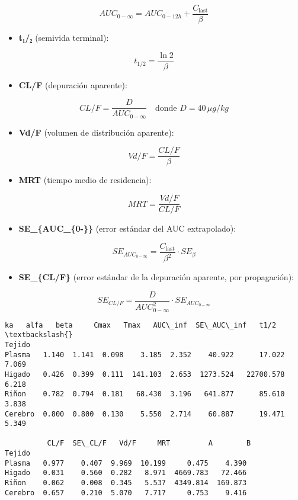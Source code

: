 \documentclass[11pt]{article}
\providecommand{\tightlist}{%
      \setlength{\itemsep}{0pt}\setlength{\parskip}{0pt}}
\begin{document}
\[
AUC_{0-\infty} = AUC_{0-12h} + \frac{C_{\text{last}}}{\beta}
\]

\begin{itemize}
\tightlist
\item
  \textbf{t₁/₂} (semivida terminal):
\end{itemize}

\[
t_{1/2} = \frac{\ln 2}{\beta}
\]

\begin{itemize}
\tightlist
\item
  \textbf{CL/F} (depuración aparente):
\end{itemize}

\[
CL/F = \frac{D}{AUC_{0-\infty}} \quad \text{donde } D = 40 \, \mu g/kg
\]

\begin{itemize}
\tightlist
\item
  \textbf{Vd/F} (volumen de distribución aparente):
\end{itemize}

\[
Vd/F = \frac{CL/F}{\beta}
\]

\begin{itemize}
\tightlist
\item
  \textbf{MRT} (tiempo medio de residencia):
\end{itemize}

\[
MRT = \frac{Vd/F}{CL/F}
\]

\begin{itemize}
\tightlist
\item
  \textbf{SE\_\{AUC\_\{0-\infty\}\}} (error estándar del AUC
  extrapolado):
\end{itemize}

\[
SE_{AUC_{0-\infty}} = \frac{C_{\text{last}}}{\beta^2} \cdot SE_{\beta}
\]

\begin{itemize}
\tightlist
\item
  \textbf{SE\_\{CL/F\}} (error estándar de la depuración aparente, por
  propagación):
\end{itemize}

\[
SE_{CL/F} = \frac{D}{AUC_{0-\infty}^2} \cdot SE_{AUC_{0-\infty}}
\]

    \begin{Verbatim}[commandchars=\\\{\}]
            ka   alfa   beta     Cmax   Tmax   AUC\_inf  SE\_AUC\_inf   t1/2  \textbackslash{}
Tejido
Plasma   1.140  1.141  0.098    3.185  2.352    40.922      17.022  7.069
Higado   0.426  0.399  0.111  141.103  2.653  1273.524   22700.578  6.218
Riñon    0.782  0.794  0.181   68.430  3.196   641.877      85.610  3.838
Cerebro  0.800  0.800  0.130    5.550  2.714    60.887      19.471  5.349

          CL/F  SE\_CL/F   Vd/F     MRT         A        B
Tejido
Plasma   0.977    0.407  9.969  10.199     0.475    4.390
Higado   0.031    0.560  0.282   8.971  4669.783   72.466
Riñon    0.062    0.008  0.345   5.537  4349.814  169.873
Cerebro  0.657    0.210  5.070   7.717     0.753    9.416
    \end{Verbatim}
\end{document}
